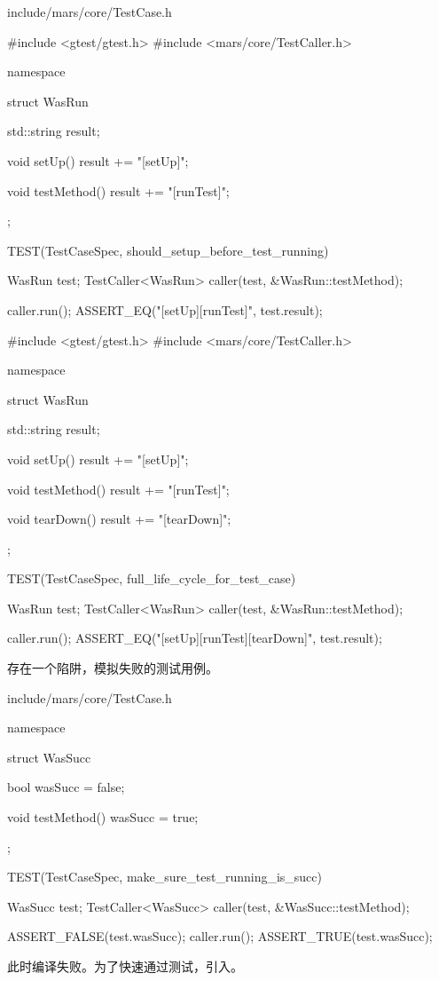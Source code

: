 \begin{diff}{include/mars/core/TestCase.h}
\begin{minicpp}
#include <gtest/gtest.h>
#include <mars/core/TestCaller.h>

namespace {
  struct WasRun {
    std::string result;

    void setUp() {
      result += "[setUp]";
    }

    void testMethod() {
      result += "[runTest]";
    }
  };
}

TEST(TestCaseSpec, should_setup_before_test_running) {
  WasRun test;
  TestCaller<WasRun> caller(test, &WasRun::testMethod);

  caller.run();
  ASSERT_EQ("[setUp][runTest]", test.result);
}
\end{minicpp}
\tcblower
\begin{minicpp}
#include <gtest/gtest.h>
#include <mars/core/TestCaller.h>

namespace {
  struct WasRun {
    std::string result;

    void setUp() {
      result += "[setUp]";
    }

    void testMethod() {
      result += "[runTest]";
    }

    void tearDown() {
      result += "[tearDown]";
    }
  };
}

TEST(TestCaseSpec, full_life_cycle_for_test_case) {
  WasRun test;
  TestCaller<WasRun> caller(test, &WasRun::testMethod);

  caller.run();
  ASSERT_EQ("[setUp][runTest][tearDown]", test.result);
}
\end{minicpp}
\end{diff}

存在一个陷阱，模拟失败的测试用例。

\begin{nodiff}{include/mars/core/TestCase.h}
\begin{c++}
namespace {
  struct WasSucc {
    bool wasSucc = false;

    void testMethod() {
      wasSucc = true;
    }
  };
}

TEST(TestCaseSpec, make_sure_test_running_is_succ) {
  WasSucc test;
  TestCaller<WasSucc> caller(test, &WasSucc::testMethod);

  ASSERT_FALSE(test.wasSucc);
  caller.run();
  ASSERT_TRUE(test.wasSucc);
}
\end{c++}
\end{nodiff}

此时编译失败。为了快速通过测试，引入。

